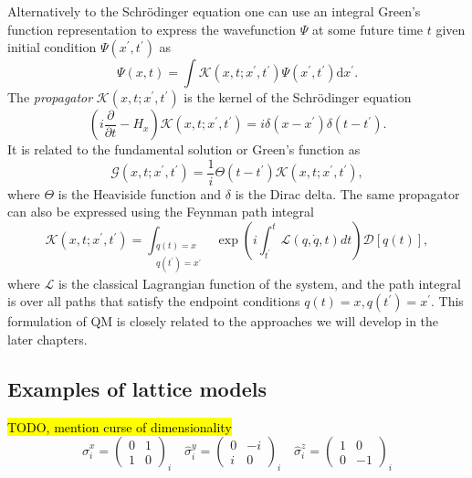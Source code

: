 Alternatively to the Schr\" odinger equation one can use an integral Green's function representation to express the wavefunction $\Psi$ at some future time $t$ given initial condition $\Psi(x^\prime, t^\prime)$ as
\begin{equation}
	\Psi\left(x, t\right)=\int  \mathcal{K}\left(x, t ; x^\prime, t^\prime\right) \Psi\left(x^\prime, t^\prime\right) \mathrm{d} x^\prime.
\end{equation}
The \emph{propagator} $\mathcal{K}\left(x, t ; x^\prime, t^\prime\right)$ is the kernel of the Schr\" odinger equation
\begin{equation}
	\left(i \frac{\partial}{\partial t}-H_{x}\right) \mathcal{K}\left(x, t ; x^\prime, t^\prime\right)=i \delta\left(x - x^\prime\right) \delta\left(t-t^\prime\right).
\end{equation}
It is related to the fundamental solution or Green's function as
\begin{equation}
	\mathcal G\left(x, t ; x^{\prime}, t^{\prime}\right)=\frac{1}{i} \Theta\left(t-t^{\prime}\right) \mathcal K\left(x, t ; x^{\prime}, t^{\prime}\right),
\end{equation}
where $\Theta$ is the Heaviside function and $\delta$ is the Dirac delta. The same propagator can also be expressed using the Feynman path integral
\begin{equation}
	\label{eq:FPI}
	\mathcal{K}\left(x, t ; x^\prime, t^\prime\right)=\int_{\substack{q(t)=x \\ q(t^\prime)=x^\prime}} \exp \left(i \int_{t^\prime}^{t} \mathcal{L}(q, \dot{q}, t) d t\right)\mathcal{D}[q(t)],
\end{equation}
where $\mathcal{L}$ is the classical Lagrangian function of the system, and the path integral is over all paths that satisfy the endpoint conditions $q(t)=x, q(t^\prime)=x^\prime$. This formulation of QM is closely related to the approaches we will develop in the later chapters. 

\subsection{Examples of lattice models}
\label{subsec:latt-examples}
\hl{TODO, mention curse of dimensionality}
\begin{equation}
	\hat{\sigma}^x_{i}=\left(\begin{array}{cc}0 & 1 \\ 1 & 0\end{array}\right)_{i} \quad \hat{\sigma}^y_{i}=\left(\begin{array}{cc}0 & -i \\ i & 0\end{array}\right)_{i} \quad \hat{\sigma}^z_{i}=\left(\begin{array}{cc}1 & 0 \\ 0 & -1\end{array}\right)_{i}
\end{equation}
